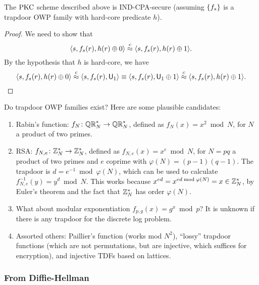 \documentclass[11pt]{article}
\begin{document}
\begin{theorem}
  \label{thm:td-owp-pkc}
  The $\text{PKC}$ scheme described above is IND-CPA-secure (assuming
  $\{f_{s}\}$ is a trapdoor OWP family with hard-core predicate
  $h$).
\end{theorem}

\begin{proof}
  We need to show that \[ \langle s, f_{s}(r), h(r) \oplus 0 \rangle
  \stackrel{c}{\approx} \langle s, f_{s}(r), h(r) \oplus 1 \rangle. \] By the
  hypothesis that $h$ is hard-core, we have \[ \langle s, f_{s}(r),
  h(r) \oplus 0 \rangle \stackrel{c}{\approx} \langle s, f_{s}(r), \mathsf{U}_{1}
  \rangle \equiv \langle s, f_{s}(r), \mathsf{U}_{1} \oplus 1 \rangle
  \stackrel{c}{\approx} \langle s, f_{s}(r), h(r) \oplus 1 \rangle. \]
\end{proof}

Do trapdoor OWP families exist?  Here are some plausible candidates:
\begin{enumerate}

\item Rabin's function: $f_{N} \colon \mathbb{QR}_{N}^{*} \to \mathbb{QR}_{N}^{*}$,
  defined as $f_{N}(x) = x^{2} \bmod N$, for $N$ a product of two
  primes.

\item RSA: $f_{N,e} \colon \mathbb{Z}_N^{*} \to \mathbb{Z}_N^{*}$, defined as $f_{N,
    e}(x) = x^{e} \bmod N$, for $N = pq$ a product of two primes and
  $e$ coprime with $\varphi(N) = (p-1)(q-1)$.  The trapdoor is $d =
  e^{-1} \bmod \varphi(N)$, which can be used to calculate $f_{N,
    e}^{-1}(y) = y^{d} \bmod N$.  This works because $x^{ed} = x^{ed
    \bmod \varphi(N)} = x \in \mathbb{Z}_N^{*}$, by Euler's theorem and the
  fact that $\mathbb{Z}_N^{*}$ has order $\varphi(N)$.

\item What about modular exponentiation $f_{p,g}(x) = g^{x} \bmod p$?
  It is unknown if there is any trapdoor for the discrete log problem.

\item Assorted others: Paillier's function (works mod $N^{2}$),
  ``lossy'' trapdoor functions (which are not permutations, but are
  injective, which suffices for encryption), and injective TDFs based
  on lattices.
\end{enumerate}

\subsubsection{From Diffie-Hellman}
\label{sec:from-diffie-hellman}
\end{document}
